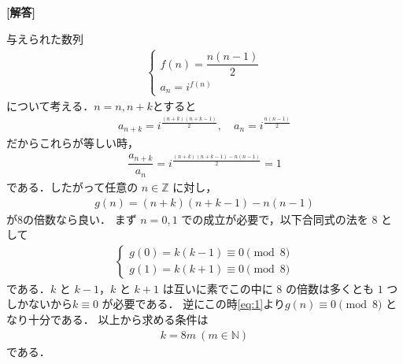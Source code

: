 \documentclass[../../main.tex]{subfiles}
\begin{document}
\begin{oframed}
  
\end{oframed}

{\bf [解答]}

与えられた数列
\begin{align}
  \begin{cases}
    f(n) = \dfrac{n(n-1)}{2} \\
    a_n = i^{f(n)}
  \end{cases}
\end{align}
について考える．$n=n,n+k$とすると
\begin{align}
  a_{n+k} = i^{\frac{(n+k)(n+k-1)}{2}},
  \quad
  a_n = i^{\frac{n(n-1)}{2}}
\end{align}
だからこれらが等しい時，
\begin{align}
  \dfrac{a_{n+k}}{a_n} = i^{\frac{(n+k)(n+k-1)-n(n-1)}{2}} = 1
\end{align}
である．したがって任意の $n \in \mathbb{Z}$ に対し，
\begin{align}
  g(n) = (n+k)(n+k-1)-n(n-1) \label{eq:1}
\end{align}
が$8$の倍数なら良い．
まず $n=0, 1$ での成立が必要で，以下合同式の法を $8$ として
\begin{align}
  \begin{cases}
    g(0) = k(k-1) \equiv 0 \pmod 8\\
    g(1) = k(k+1) \equiv 0 \pmod 8
  \end{cases}
\end{align}
である．$k$ と $k-1$，$k$ と $k+1$ は互いに素でこの中に $8$ の倍数は多くとも $1$ つしかないから$k \equiv 0$ が必要である．
逆にこの時\cref{eq:1}より$g(n) \equiv 0 \pmod 8$ となり十分である．
以上から求める条件は
\begin{align}
  k = 8m \ (m \in \mathbb{N})
\end{align}
である．
\end{document}
